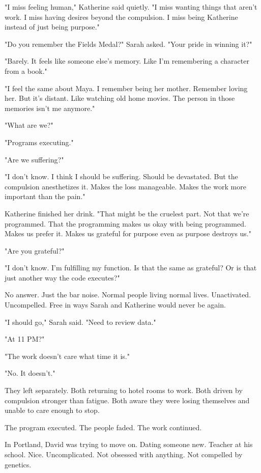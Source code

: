 "I miss feeling human," Katherine said quietly. "I miss wanting things that aren't work. I miss having desires beyond the compulsion. I miss being Katherine instead of just being purpose."

"Do you remember the Fields Medal?" Sarah asked. "Your pride in winning it?"

"Barely. It feels like someone else's memory. Like I'm remembering a character from a book."

"I feel the same about Maya. I remember being her mother. Remember loving her. But it's distant. Like watching old home movies. The person in those memories isn't me anymore."

"What are we?"

"Programs executing."

"Are we suffering?"

"I don't know. I think I should be suffering. Should be devastated. But the compulsion anesthetizes it. Makes the loss manageable. Makes the work more important than the pain."

Katherine finished her drink. "That might be the cruelest part. Not that we're programmed. That the programming makes us okay with being programmed. Makes us prefer it. Makes us grateful for purpose even as purpose destroys us."

"Are you grateful?"

"I don't know. I'm fulfilling my function. Is that the same as grateful? Or is that just another way the code executes?"

No answer. Just the bar noise. Normal people living normal lives. Unactivated. Uncompelled. Free in ways Sarah and Katherine would never be again.

"I should go," Sarah said. "Need to review data."

"At 11 PM?"

"The work doesn't care what time it is."

"No. It doesn't."

They left separately. Both returning to hotel rooms to work. Both driven by compulsion stronger than fatigue. Both aware they were losing themselves and unable to care enough to stop.

The program executed. The people faded. The work continued.

\scenebreak

In Portland, David was trying to move on. Dating someone new. Teacher at his school. Nice. Uncomplicated. Not obsessed with anything. Not compelled by genetics.

